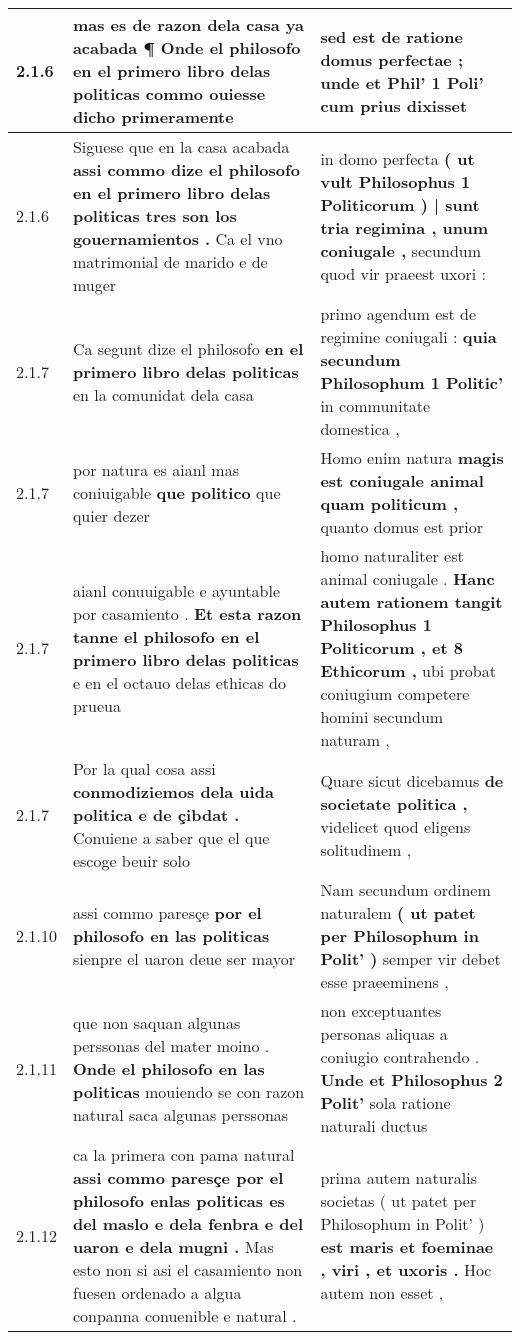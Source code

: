 \begin{tabular}{|p{1cm}|p{6.5cm}|p{6.5cm}|}
2.1.6 & mas es de razon dela casa ya acabada \textbf{ ¶ Onde el philosofo en el primero libro delas politicas } commo ouiesse dicho primeramente & sed est de ratione domus perfectae ; \textbf{ unde et Phil’ 1 Poli’ } cum prius dixisset \\\hline
2.1.6 & Siguese que en la casa acabada \textbf{ assi commo dize el philosofo en el primero libro delas politicas tres son los gouernamientos . } Ca el vno matrimonial de marido e de muger & in domo perfecta \textbf{ ( ut vult Philosophus 1 Politicorum ) | sunt tria regimina , unum coniugale , } secundum quod vir praeest uxori : \\\hline
2.1.7 & Ca segunt dize el philosofo \textbf{ en el primero libro delas politicas } en la comunidat dela casa & primo agendum est de regimine coniugali : \textbf{ quia secundum Philosophum 1 Politic’ } in communitate domestica , \\\hline
2.1.7 & por natura es aianl mas coniuigable \textbf{ que politico } que quier dezer & Homo enim natura \textbf{ magis est coniugale animal quam politicum , } quanto domus est prior \\\hline
2.1.7 & aianl conuuigable e ayuntable por casamiento . \textbf{ Et esta razon tanne el philosofo en el primero libro delas politicas } e en el octauo delas ethicas do prueua & homo naturaliter est animal coniugale . \textbf{ Hanc autem rationem tangit Philosophus 1 Politicorum , et 8 Ethicorum , } ubi probat coniugium competere homini secundum naturam , \\\hline
2.1.7 & Por la qual cosa assi \textbf{ conmodiziemos dela uida politica e de çibdat . } Conuiene a saber que el que escoge beuir solo & Quare sicut dicebamus \textbf{ de societate politica , } videlicet quod eligens solitudinem , \\\hline
2.1.10 & assi commo paresçe \textbf{ por el philosofo en las politicas } sienpre el uaron deue ser mayor & Nam secundum ordinem naturalem \textbf{ ( ut patet per Philosophum in Polit’ ) } semper vir debet esse praeeminens , \\\hline
2.1.11 & que non saquan algunas perssonas del mater moino . \textbf{ Onde el philosofo en las politicas } mouiendo se con razon natural saca algunas perssonas & non exceptuantes personas aliquas a coniugio contrahendo . \textbf{ Unde et Philosophus 2 Polit’ } sola ratione naturali ductus \\\hline
2.1.12 & ca la primera con pama natural \textbf{ assi commo paresçe por el philosofo enlas politicas es del maslo e dela fenbra e del uaron e dela mugni . } Mas esto non si asi el casamiento non fuesen ordenado a algua conpanna conuenible e natural . & prima autem naturalis societas ( ut patet per Philosophum in Polit’ ) \textbf{ est maris et foeminae , viri , et uxoris . } Hoc autem non esset , \\\hline

\end{tabular}
